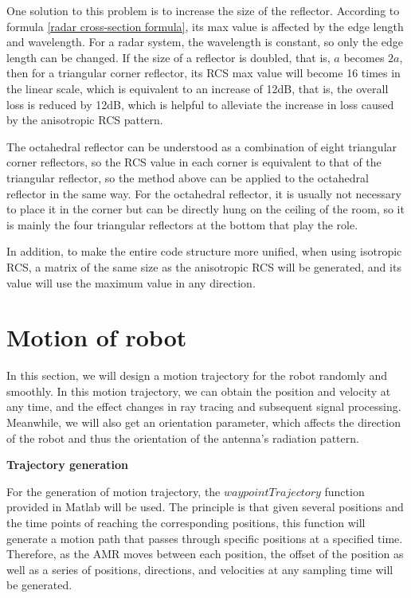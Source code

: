 \documentclass[12pt,DIV14,BCOR12mm,a4paper,footinclude=false,headinclude,parskip=half-,twoside,openright,cleardoublepage=empty,toc=index,bibliography=totoc,listof=totoc]{scrreprt}
\numberwithin{equation}{chapter}
\begin{document}
One solution to this problem is to increase the size of the reflector. According to formula \ref{radar cross-section formula}, its max value is affected by the edge length and wavelength. For a radar system, the wavelength is constant, so only the edge length can be changed. If the size of a reflector is doubled, that is, $a$ becomes $2a$, then for a triangular corner reflector, its RCS max value will become 16 times in the linear scale, which is equivalent to an increase of 12dB, that is, the overall loss is reduced by 12dB, which is helpful to alleviate the increase in loss caused by the anisotropic RCS pattern.

The octahedral reflector can be understood as a combination of eight triangular corner reflectors, so the RCS value in each corner is equivalent to that of the triangular reflector, so the method above can be applied to the octahedral reflector in the same way. For the octahedral reflector, it is usually not necessary to place it in the corner but can be directly hung on the ceiling of the room, so it is mainly the four triangular reflectors at the bottom that play the role.

In addition, to make the entire code structure more unified, when using isotropic RCS, a matrix of the same size as the anisotropic RCS will be generated, and its value will use the maximum value in any direction.

\section{Motion of robot} \label{Motion of robot}
In this section, we will design a motion trajectory for the robot randomly and smoothly. In this motion trajectory, we can obtain the position and velocity at any time, and the effect changes in ray tracing and subsequent signal processing. Meanwhile, we will also get an orientation parameter, which affects the direction of the robot and thus the orientation of the antenna's radiation pattern.

\begin{spacing}{1.5}
\textbf{\large{Trajectory generation}}
\end{spacing}
For the generation of motion trajectory, the $waypointTrajectory$ function provided in Matlab \cite{trajectory_generation} will be used. The principle is that given several positions and the time points of reaching the corresponding positions, this function will generate a motion path that passes through specific positions at a specified time. Therefore, as the AMR moves between each position, the offset of the position as well as a series of positions, directions, and velocities at any sampling time will be generated.
\end{document}
